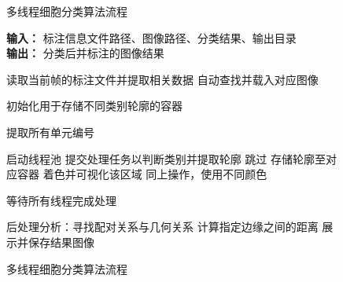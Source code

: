 \begin{figure}[htbp]
    \centering
    \begin{algorithm}[H]
        \caption{多线程细胞分类算法流程}
        \label{alg:cell_classification}

        \textbf{输入：} 标注信息文件路径、图像路径、分类结果、输出目录 \\
        \textbf{输出：} 分类后并标注的图像结果
        
        \begin{algorithmic}[1]
            \STATE 读取当前帧的标注文件并提取相关数据
                \STATE 自动查找并载入对应图像
            \ENDIF
            
            \STATE 初始化用于存储不同类别轮廓的容器
            
            \STATE 提取所有单元编号
            
            \STATE 启动线程池
                \STATE 提交处理任务以判断类别并提取轮廓
                    \STATE 跳过
                    \STATE 存储轮廓至对应容器
                    \STATE 着色并可视化该区域
                    \STATE 同上操作，使用不同颜色
                \ENDIF
            \ENDFOR
            
            \STATE 等待所有线程完成处理
            
            \STATE 后处理分析：寻找配对关系与几何关系
            \STATE 计算指定边缘之间的距离
            \STATE 展示并保存结果图像
        \end{algorithmic}
    \end{algorithm}
    \caption{多线程细胞分类算法流程}\label{fig:flowchart_classification}
\end{figure}
